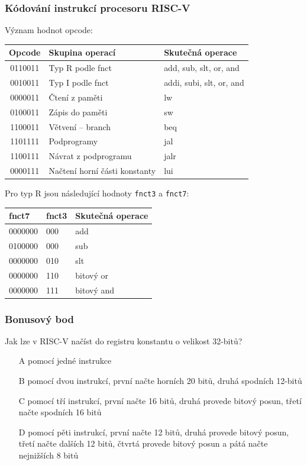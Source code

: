 \documentclass{beamer}
\begin{document}
\begin{frame}
\frametitle{Kódování instrukcí procesoru RISC-V}

Význam hodnot opcode:
\begin{table}
\footnotesize
\begin{tabular}{|c|l|l|}\hline
Opcode & Skupina operací & Skutečná operace \\ \hline
0110011 & Typ R podle fnct & add, sub, slt, or, and \\ \hline
0010011 & Typ I podle fnct & addi, subi, slt, or, and \\ \hline
0000011 & Čtení z paměti & lw \\ \hline
0100011 & Zápis do paměti & sw \\ \hline
1100011 & Větvení -- branch & beq \\ \hline
1101111 & Podprogramy & jal \\ \hline
1100111 & Návrat z podprogramu & jalr \\ \hline
0000111 & Načtení horní části konstanty & lui \\ \hline
\end{tabular}
\end{table}

Pro typ R jsou následující hodnoty \texttt{fnct3} a \texttt{fnct7}:
\begin{table}
\footnotesize
\begin{tabular}{|l|l|l|}\hline
fnct7 & fnct3 & Skutečná operace \\ \hline
0000000 & 000  & add \\ \hline
0100000 & 000  & sub \\ \hline
0000000 & 010  & slt \\ \hline
0000000 & 110  & bitový or \\ \hline
0000000 & 111  & bitový and \\ \hline
\end{tabular}
\end{table}

\end{frame}

\begin{frame}
\frametitle{Bonusový bod}

Jak lze v RISC-V načíst do registru konstantu o velikost 32-bitů?
\begin{itemize}
\item[A] pomocí jedné instrukce
\item[B] pomocí dvou instrukcí, první načte horních 20 bitů, druhá spodních 12-bitů
\item[C] pomocí tří instrukcí, první načte 16 bitů, druhá provede bitový posun, třetí načte spodních 16 bitů
\item[D] pomocí pěti instrukcí, první načte 12 bitů, druhá provede bitový posun, třetí načte dalších 12 bitů, čtvrtá provede bitový posun a pátá načte nejnižších 8 bitů 
\end{itemize}
\end{frame}
\end{document}
